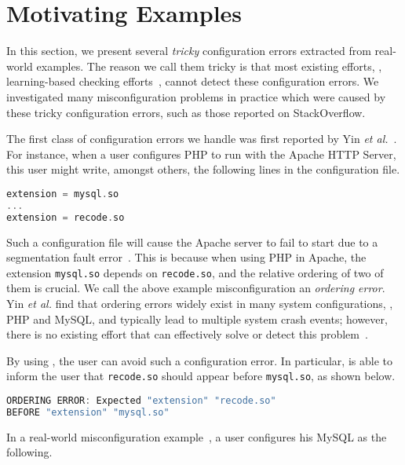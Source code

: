 \section{Motivating Examples}
\label{sec-motiv}

In this section, we present several {\em tricky} configuration errors
extracted from real-world examples. 
The reason we call them tricky is that
most existing efforts, \eg, learning-based checking
efforts~\cite{zhang14encore, wang04automatic}, cannot detect
these configuration errors. We investigated 
many misconfiguration problems in practice which were caused by 
these tricky configuration errors, such as those reported on StackOverflow.

The first class of configuration errors we handle was first reported by 
Yin {\em et al.}~\cite{yin11anempirical}.
For instance, when a user configures PHP to run with the
Apache HTTP Server, this user might write, amongst others, 
the following lines in the configuration file.

\begin{lstlisting}[language=C, xleftmargin=.01\textwidth]
extension = mysql.so
...
extension = recode.so
\end{lstlisting} 

Such a configuration file will cause the Apache server to 
fail to start due to a segmentation fault error~\cite{yin11anempirical}. 
This is because when using PHP in Apache, the extension {\tt mysql.so} 
depends on {\tt recode.so}, and the relative ordering of two of them 
is crucial. 
We call the above example misconfiguration 
an {\em ordering error}.
Yin {\em et al.} find that ordering errors widely exist in
many system configurations, \eg, PHP and MySQL,
and typically lead to multiple system crash events;
however, there is no existing effort that can effectively solve 
or detect this problem~\cite{zhang14encore, xu15systems, xu13do}.

By using \app, the user can avoid such a configuration error.
In particular, \app is able to inform the user that {\tt recode.so} 
should appear before {\tt mysql.so}, as shown
below.

\begin{lstlisting}[language=C, xleftmargin=.01\textwidth]
ORDERING ERROR: Expected "extension" "recode.so"
BEFORE "extension" "mysql.so"
\end{lstlisting} 

In a real-world misconfiguration example~\cite{correlation}, 
a user configures his MySQL as the following.

